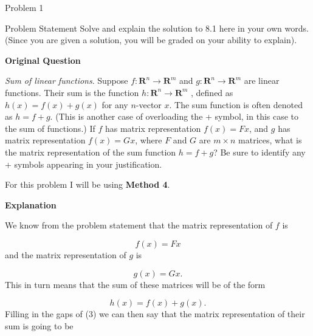 \begin{problem}{Problem 1}
    \begin{statement}{Problem Statement}
        Solve and explain the solution to 8.1  here in your own words. (Since you are given a solution, you will be graded on your ability to explain). \vspace*{1em}

        \noindent \textbf{Original Question} \vspace*{1em}

        \textit{Sum of linear functions}. Suppose $f : \mathbf{R}^{n} \rightarrow \mathbf{R}^{m}$ and $g : \mathbf{R}^{n} \rightarrow \mathbf{R}^{m}$ are linear functions. Their sum is the function 
        $h : \mathbf{R}^{n} \rightarrow \mathbf{R}^{m}$ , defined as $h(x) = f (x) + g(x)$ for any $n$-vector $x$. The sum function is often denoted as $h = f + g$. (This is another case of overloading
        the + symbol, in this case to the sum of functions.) If $f$ has matrix representation $f(x) = Fx$, and $g$ has matrix representation $f(x) = Gx$, where $F$ and $G$ are $m \times n$ matrices, 
        what is the matrix representation of the sum function $h = f + g$? Be sure to identify any + symbols appearing in your justification.
    \end{statement}

    \begin{highlight}[Solution]
        For this problem I will be using \textbf{Method 4}. \vspace*{1em}

        \noindent \textbf{Explanation} \vspace*{1em}

        We know from the problem statement that the matrix representation of $f$ is

        \begin{equation}
            f(x) = Fx
        \end{equation}
        and the matrix representation of $g$ is

        \begin{equation}
            g(x) = Gx.
        \end{equation}
        This in turn means that the sum of these matrices will be of the form

        \begin{equation}
            h(x) = f(x) + g(x).
        \end{equation}
        Filling in the gaps of (3) we can then say that the matrix representation of their sum is going to be


\end{highlight}
\end{problem}
